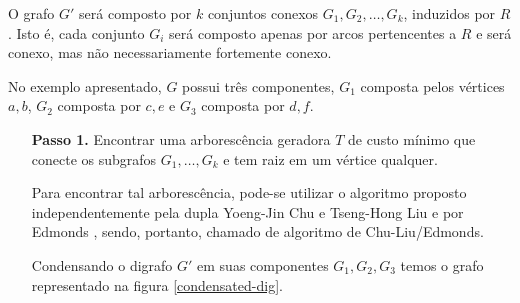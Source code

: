 		O grafo $G'$ será composto por $k$ conjuntos conexos $G_1, G_2, \dots, G_k$, induzidos por $R$. 
		Isto é, cada conjunto $G_i$ será composto apenas por arcos pertencentes a $R$ e será conexo, mas não necessariamente fortemente conexo.

        No exemplo apresentado, $G$ possui três componentes, $G_1$ composta pelos vértices $a, b$, $G_2$ composta por $c, e$ e $G_3$ composta por $d, f$.


	\begin{enumerate}


        \item[\textbf{Passo 1.}] 
			Encontrar uma arborescência geradora $T$ de custo mínimo que conecte os subgrafos $G_1, \dots, G_k$ e tem raiz em um vértice qualquer.

            Para encontrar tal arborescência, pode-se utilizar o algoritmo proposto independentemente pela dupla Yoeng-Jin Chu e Tseng-Hong Liu e por Edmonds \cite{edmonds-ssa}, sendo, portanto, chamado de algoritmo de Chu-Liu/Edmonds.

            Condensando o digrafo $G'$ em suas componentes $G_1, G_2, G_3$ temos o grafo representado na figura \ref{condensated-dig}.


            \begin{figure}[H]
                \centering
\end{figure}
\end{enumerate}
